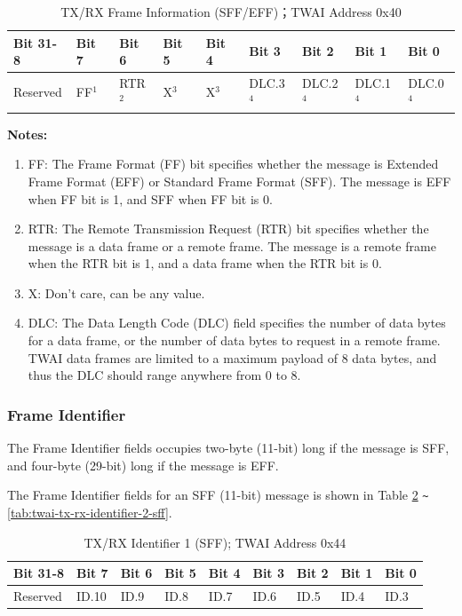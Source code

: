 \documentclass[main\_\_EN.tex]{subfiles}
\begin{document}
\begin{longtable}[c]{|p{1.4cm}|p{1.4cm}|p{1.4cm}|p{1.4cm}|p{1.4cm}|p{1.4cm}|p{1.4cm}|p{1.4cm}|p{1.4cm}|}
    \caption{TX/RX Frame Information (SFF/EFF)；TWAI Address 0x40}
    \label{tab:twai-tx-rx-frame-info-sff-eff}\\
    \hline
       \rowcolor{lightgray}
    \textbf{Bit 31-8} & \textbf{Bit 7} & \textbf{Bit 6} & \textbf{Bit 5} & \textbf{Bit 4} & \textbf{Bit 3} & \textbf{Bit 2} & \textbf{Bit 1} & \textbf{Bit 0}\\\hline
    Reserved & FF$^1$ & RTR$^2$  & X$^3$  & X$^3$  & DLC.3$^4$ & DLC.2$^4$ & DLC.1$^4$ & DLC.0$^4$\\
    \hline
\end{longtable}
\vspace{-1.5em}
{\bfseries Notes:}\\
\begin{enumerate}
    \item FF: The Frame Format (FF) bit specifies whether the message is Extended Frame Format (EFF) or Standard Frame Format (SFF). The message is EFF when FF bit is 1, and SFF when FF bit is 0.
    \item RTR: The Remote Transmission Request (RTR) bit specifies whether the message is a data frame or a remote frame. The message is a remote frame when the RTR bit is 1, and a data frame when the RTR bit is 0.
    \item X: Don’t care, can be any value.
    \item DLC: The Data Length Code (DLC) field specifies the number of data bytes for a data frame, or the number of data bytes to request in a remote frame. TWAI data frames are limited to a maximum payload of 8 data bytes, and thus the DLC should range anywhere from 0 to 8.
\end{enumerate}


\subsubsection{Frame Identifier}
The Frame Identifier fields occupies two-byte (11-bit) long if the message is SFF, and four-byte (29-bit) long if the message is EFF.

The Frame Identifier fields for an SFF (11-bit) message is shown in Table \ref{tab:twai-tx-rx-identifier-1-sff} \verb+~+ \ref{tab:twai-tx-rx-identifier-2-sff}. 

\begin{longtable}[c]{|p{1.4cm}|p{1.4cm}|p{1.4cm}|p{1.4cm}|p{1.4cm}|p{1.4cm}|p{1.4cm}|p{1.4cm}|p{1.4cm}|}
    \caption{TX/RX Identifier 1 (SFF); TWAI Address 0x44}
    \label{tab:twai-tx-rx-identifier-1-sff}\\
    \hline
    \rowcolor{lightgray}
    \textbf{Bit 31-8} & \textbf{Bit 7} & \textbf{Bit 6} & \textbf{Bit 5} & \textbf{Bit 4} & \textbf{Bit 3} & \textbf{Bit 2} & \textbf{Bit 1} & \textbf{Bit 0}\\\hline
    
    Reserved & ID.10 & ID.9 & ID.8 & ID.7 & ID.6 & ID.5 & ID.4 & ID.3\\
    \hline
\end{longtable}
\end{document}
